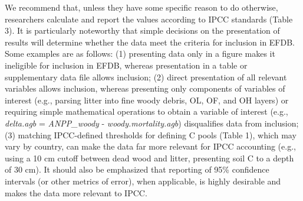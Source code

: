 \documentclass[, manuscript]{copernicus}
\begin{document}
We recommend that, unless they have some specific reason to do
otherwise, researchers calculate and report the values according to IPCC
standards (Table 3). It is particularly noteworthy that simple decisions
on the presentation of results will determine whether the data meet the
criteria for inclusion in EFDB. Some examples are as follows: (1)
presenting data only in a figure makes it ineligible for inclusion in
EFDB, whereas presentation in a table or supplementary data file allows
inclusion; (2) direct presentation of all relevant variables allows
inclusion, whereas presenting only components of variables of interest
(e.g., parsing litter into fine woody debris, OL, OF, and OH layers) or
requiring simple mathematical operations to obtain a variable of
interest (e.g., \emph{delta.agb} = \emph{ANPP\_woody} -
\emph{woody.mortality.agb}) disqualifies data from inclusion; (3)
matching IPCC-defined thresholds for defining C pools (Table 1), which
may vary by country, can make the data far more relevant for IPCC
accounting (e.g., using a 10 cm cutoff between dead wood and litter,
presenting soil C to a depth of 30 cm). It should also be emphasized
that reporting of 95\% confidence intervals (or other metrics of error),
when applicable, is highly desirable and makes the data more relevant to
IPCC.
\end{document}
